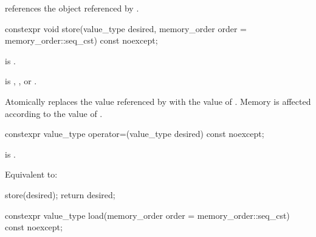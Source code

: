 \begin{itemdescr}
\pnum
\ensures
{} references the object referenced by .
\end{itemdescr}

%
%
%
%
\begin{itemdecl}
constexpr void store(value_type desired,
                     memory_order order = memory_order::seq_cst) const noexcept;
\end{itemdecl}

\begin{itemdescr}
\pnum
\constraints
{} is .

\pnum
\expects
{} is
,
, or
.

\pnum
\effects
Atomically replaces the value referenced by 
with the value of .
Memory is affected according to the value of .
\end{itemdescr}

%
%
%
%
\begin{itemdecl}
constexpr value_type operator=(value_type desired) const noexcept;
\end{itemdecl}

\begin{itemdescr}
\pnum
\constraints
{} is .

\pnum
\effects
Equivalent to:
\begin{codeblock}
store(desired);
return desired;
\end{codeblock}
\end{itemdescr}

%
%
%
%
\begin{itemdecl}
constexpr value_type load(memory_order order = memory_order::seq_cst) const noexcept;
\end{itemdecl}

